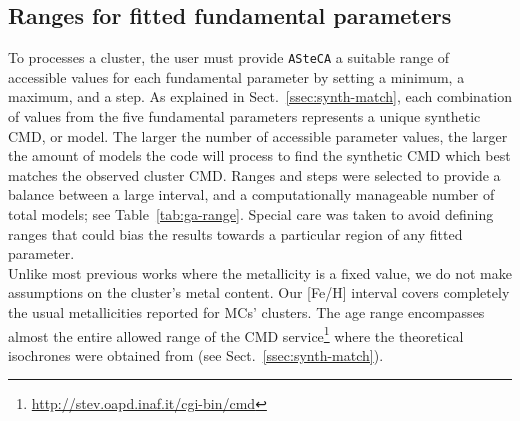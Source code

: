 \documentclass[draft]{aa}
\begin{document}

\subsection{Ranges for fitted fundamental parameters}
\label{ssec:param-ranges}

To processes a cluster, the user must provide \texttt{ASteCA} a
suitable range of accessible values for each fundamental parameter by
setting a minimum, a maximum, and a step.
%
As explained in Sect.~\ref{ssec:synth-match}, each combination of values
from the five fundamental parameters represents a unique synthetic CMD, or
model.
%
%
The larger the number of accessible parameter values, the larger the
amount of models the code will process to find the synthetic CMD which best
matches the observed cluster CMD.\@
%
Ranges and steps were selected to provide a balance between a large interval,
and a computationally manageable number of total models;
see Table~\ref{tab:ga-range}. Special care was taken to avoid defining ranges
that could bias the results towards a particular region of any fitted
parameter.\\

Unlike most previous works where the metallicity is a fixed value, we do not
make assumptions on the cluster's metal content. Our [Fe/H] interval covers
completely the usual metallicities reported for MCs' clusters.
The age range encompasses almost the entire allowed range of the CMD
service\footnote{\url{http://stev.oapd.inaf.it/cgi-bin/cmd}}
where the theoretical isochrones were obtained from (see
Sect.~\ref{ssec:synth-match}).
\end{document}
